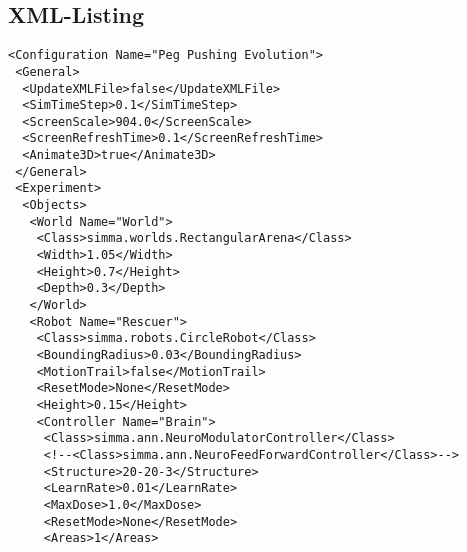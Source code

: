 \documentclass[12pt,fleqn,a4paper]{article}
\begin{document}
\subsection{XML-Listing}

\lstset{language=XML}
\begin{lstlisting}
<Configuration Name="Peg Pushing Evolution">
 <General>
  <UpdateXMLFile>false</UpdateXMLFile>
  <SimTimeStep>0.1</SimTimeStep>
  <ScreenScale>904.0</ScreenScale>
  <ScreenRefreshTime>0.1</ScreenRefreshTime>
  <Animate3D>true</Animate3D>
 </General>
 <Experiment>
  <Objects>
   <World Name="World">
    <Class>simma.worlds.RectangularArena</Class>
    <Width>1.05</Width>
    <Height>0.7</Height>
    <Depth>0.3</Depth>
   </World>
   <Robot Name="Rescuer">
    <Class>simma.robots.CircleRobot</Class>
    <BoundingRadius>0.03</BoundingRadius>
    <MotionTrail>false</MotionTrail>
    <ResetMode>None</ResetMode>
    <Height>0.15</Height>
    <Controller Name="Brain">
     <Class>simma.ann.NeuroModulatorController</Class>
     <!--<Class>simma.ann.NeuroFeedForwardController</Class>-->
     <Structure>20-20-3</Structure>
     <LearnRate>0.01</LearnRate>
     <MaxDose>1.0</MaxDose>
     <ResetMode>None</ResetMode>
     <Areas>1</Areas>
     

\end{lstlisting}
\end{document}
